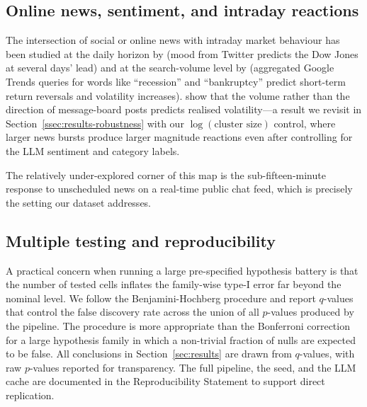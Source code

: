 \subsection{Online news, sentiment, and intraday reactions}
\label{ssec:lit-online}

The intersection of social or online news with intraday market
behaviour has been studied at the daily horizon by
\citet{bollen2011twitter} (mood from Twitter predicts the Dow Jones
at several days' lead) and at the search-volume level by
\citet{da2015fears} (aggregated Google Trends queries for words like
``recession'' and ``bankruptcy'' predict short-term return reversals
and volatility increases). \citet{antweiler2004talk} show that the
volume rather than the direction of message-board posts predicts
realised volatility---a result we revisit in
Section~\ref{ssec:results-robustness} with our $\log(\text{cluster size})$
control, where larger news bursts produce larger magnitude reactions
even after controlling for the LLM sentiment and category labels.

The relatively under-explored corner of this map is the
sub-fifteen-minute response to unscheduled news on a real-time public
chat feed, which is precisely the setting our dataset addresses.

\subsection{Multiple testing and reproducibility}
\label{ssec:lit-multiple-testing}

A practical concern when running a large pre-specified hypothesis
battery is that the number of tested cells inflates the family-wise
type-I error far beyond the nominal level. We follow the
Benjamini-Hochberg procedure \citep{benjamini1995controlling} and
report $q$-values that control the false discovery rate across the
union of all $p$-values produced by the pipeline. The procedure is
more appropriate than the Bonferroni correction for a large
hypothesis family in which a non-trivial fraction of nulls are
expected to be false. All conclusions in Section~\ref{sec:results}
are drawn from $q$-values, with raw $p$-values reported for
transparency. The full pipeline, the seed, and the LLM cache are
documented in the Reproducibility Statement to support direct
replication.
